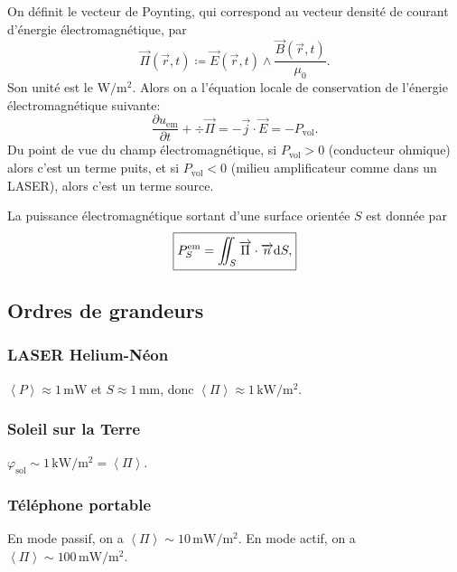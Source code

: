 On définit le vecteur de Poynting, qui correspond au vecteur densité de courant d'énergie électromagnétique, par
\begin{equation}
    \boxed{
        \vec{\Pi}(\vec{r},t)\coloneqq\vec{E}(\vec{r},t)\wedge\frac{\vec{B}(\vec{r},t)}{\mu_0}.
    }
\end{equation}
Son unité est le $\si{\watt\per\metre\squared}$. Alors on a l'équation locale de conservation de l'énergie électromagnétique suivante:
\begin{equation}
    \boxed{
        \frac{\partial u_{\mathrm{em}}}{\partial t}+\div\vec{\Pi}=-\vec{j}\cdot\vec{E}=-P_{\mathrm{vol}}.
    }
\end{equation}
Du point de vue du champ électromagnétique, si $P_{\mathrm{vol}}>0$ (conducteur ohmique) alors c'est un terme \og puits\fg, et si $P_{\mathrm{vol}}<0$ (milieu amplificateur comme dans un LASER), alors c'est un terme \og source\fg.

La puissance électromagnétique sortant d'une surface orientée $S$ est donnée par
\begin{equation}
    \boxed{
        P_{S}^{\mathrm{em}}=\iint_{S}\protect\overrightarrow{{\Pi}}\cdot\protect\overrightarrow{{n}}\mathrm{d} S,
    }
\end{equation}

\subsection{Ordres de grandeurs}
\subsubsection{LASER Helium-Néon}
$\left\langle P\right\rangle\approx1\,\si{\milli\watt}$ et $S\approx1\,\si{\milli\metre}$, donc $\left\langle\Pi\right\rangle\approx1\,\si{\kilo\watt\per\metre\squared}$.

\subsubsection{Soleil sur la Terre}
$\varphi_{\mathrm{sol}}\sim1\,\si{\kilo\watt\per\metre\squared}=\left\langle\Pi\right\rangle$.

\subsubsection{Téléphone portable}
En mode \og passif\fg, on a $\left\langle\Pi\right\rangle\sim10\,\si{\milli\watt\per\metre\squared}$. En mode \og actif\fg, on a $\left\langle\Pi\right\rangle\sim100\,\si{\milli\watt\per\metre\squared}$.

